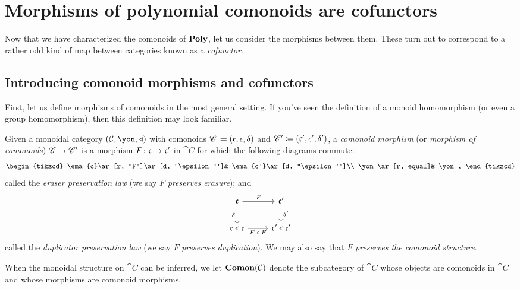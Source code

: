 \documentclass[Book-Poly]{subfiles}
\begin{document}
\section{Morphisms of polynomial comonoids are cofunctors}

Now that we have characterized the comonoids of $\mathbf{Poly}$, let us consider the morphisms between them.
These turn out to correspond to a rather odd kind of map between categories known as a \emph{cofunctor}.

\subsection{Introducing comonoid morphisms and cofunctors}

First, let us define morphisms of comonoids in the most general setting.
If you've seen the definition of a monoid homomorphism (or even a group homomorphism), then this definition may look familiar.

\begin{definition}\label{def.morphism_comonoids}
Given a monoidal category $(\cat{C},\yon,\tri)$ with comonoids $\mathscr{C}\coloneqq(\mathfrak{c},\epsilon,\delta)$ and $\mathscr{C}'\coloneqq(\mathfrak{c'},\epsilon',\delta')$, a \emph{comonoid morphism} (or \emph{morphism of comonoids}) $\mathscr{C}\to\mathscr{C}'$ is a morphism $F\colon \mathfrak{c}\to\mathfrak{c'}$ in $\cat{C}$ for which the following diagrams commute:
\begin{equation}\label{eqn.pres_era}
\begin{tikzcd}
    \ema{c}\ar[r, "F"]\ar[d, "\epsilon"']&
    \ema{c'}\ar[d, "\epsilon'"]\\
    \yon\ar[r, equal]&
    \yon,
\end{tikzcd}
\end{equation}
called the \emph{eraser preservation law} (we say $F$ \emph{preserves erasure}); and
\begin{equation}\label{eqn.pres_dup}
\begin{tikzcd}
    \ema{c}\ar[r, "F"]\ar[d, "\delta"']&
    \ema{c'}\ar[d, "\delta'"]\\
    \ema{c}\tri\ema{c}\ar[r, "F\:\tri\:F"']&
    \ema{c'}\tri\ema{c'}
\end{tikzcd}
\end{equation}
called the \emph{duplicator preservation law} (we say $F$ \emph{preserves duplication}).
We may also say that $F$ \emph{preserves the comonoid structure}.

When the monoidal structure on $\cat{C}$ can be inferred, we let $\mathbf{Comon}(\mathcal{C})$ denote the subcategory of $\cat{C}$ whose objects are comonoids in $\cat{C}$ and whose morphisms are comonoid morphisms.
\end{definition}
\end{document}
